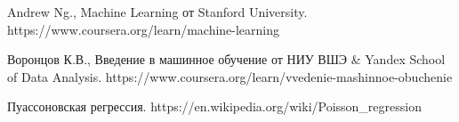 \begin{thebibliography}{00}
    
     Andrew Ng., Machine Learning от Stanford University. https://www.coursera.org/learn/machine-learning
    
     Воронцов К.В., Введение в машинное обучение от НИУ ВШЭ \& Yandex School of Data Analysis. https://www.coursera.org/learn/vvedenie-mashinnoe-obuchenie
    
     Пуассоновская регрессия. https://en.wikipedia.org/wiki/Poisson\_regression
    
\end{thebibliography}
